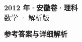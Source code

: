 \documentclass[zihao=-4, a4paper]{ctexart}
\begin{document}
\begin{center}
  {\Large\bfseries 2012 年·安徽卷·理科}\\[4pt]
  {\large 数学 · 解析版}
\end{center}
\medskip
{}

\clearpage
{}
\begin{center}{\Large\bfseries 参考答案与详细解析}\end{center}
\medskip

\end{document}
